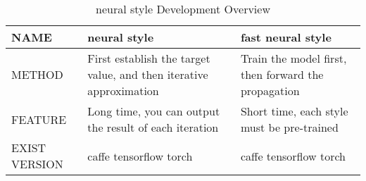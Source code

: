 \begin{table}[H]
\centering
\begin{tabular}{lll}
\toprule
  NAME     & neural style\cite{neural-style}    & fast neural style\cite{fast-neural-style} \\
\midrule
METHOD   & First establish the target value, and then iterative approximation  & Train the model first, then forward the propagation       \\
FEATURE     & Long time, you can output the result of each iteration & Short time, each style must be pre-trained  \\
EXIST VERSION &caffe tensorflow torch & caffe tensorflow torch \\
\bottomrule
\end{tabular}
\caption{neural style Development Overview}
\label{tbl:compare-neural-style}
\end{table}
